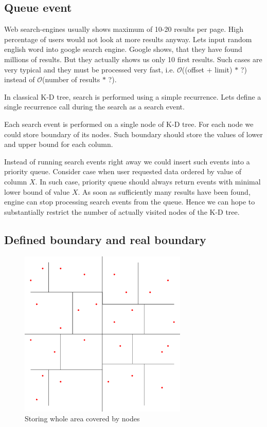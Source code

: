\documentclass[10pt,a4paper]{article}
\newcommand{\Oh}{\mathcal{O}}
\begin{document}
\subsection{Queue event}
Web search-engines usually shows maximum of 10-20 results per page. High percentage of users would not look at more results anyway. Lets input random english word into google search engine. Google shows, that they have found millions of results. But they actually shows us only 10 first results. Such cases are very typical and they must be processed very fast, i.e. $\Oh$((offset + limit) $*$ ?) instead of $\Oh$(number of results $*$ ?).

In classical K-D tree, search is performed using a simple recurrence. Lets define a single recurrence call during the search as a search event.

Each search event is performed on a single node of K-D tree. For each node we could store boundary of its nodes. Such boundary should store the values of lower and upper bound for each column.

Instead of running search events right away we could insert such events into a priority queue. Consider case when user requested data ordered by value of column $X$. In such case, priority queue should always return events with minimal lower bound of value $X$. As soon as sufficiently many results have been found, engine can stop processing search events from the queue. Hence we can hope to substantially restrict the number of actually visited nodes of the K-D tree.

\subsection{Defined boundary and real boundary}

\begin{figure}
\centering
  \includegraphics[width=8cm]{Figure1}
  \caption{Storing whole area covered by nodes}
  \label{fig:covered}
\end{figure}
\end{document}
